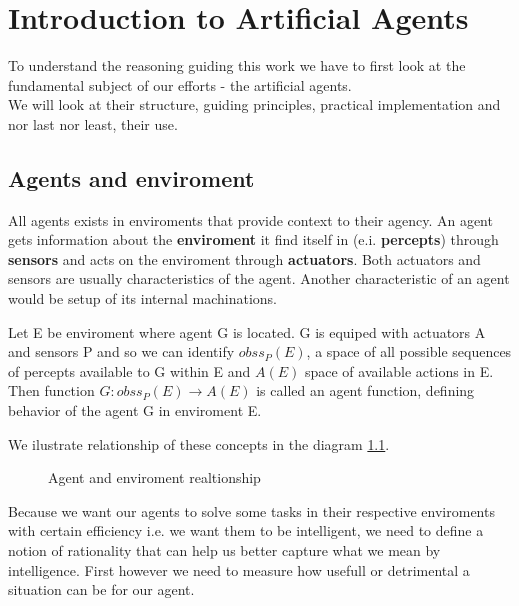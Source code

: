 \chapter{Introduction to Artificial Agents}
To understand the reasoning guiding this work we have to first look at the fundamental subject of our efforts - the artificial agents.\\
We will look at their structure, guiding principles, practical implementation and nor last nor least, their use.
\section{Agents and enviroment}
All agents exists in enviroments that provide context to their agency. An agent gets information about the \textbf{enviroment} it find itself in (e.i. \textbf{percepts}) through \textbf{sensors} and acts on the enviroment through \textbf{actuators}. Both actuators and sensors are usually characteristics of the agent. Another characteristic of an agent would be setup of its internal machinations.
\begin{defn}\citep{russell2021}
Let E be enviroment where agent G is located. G is equiped with actuators A and sensors P and so we can identify $ obss_P(E) $, a space of all possible sequences of percepts available to G within E and $ A(E) $ space of available actions in E.
Then function $ G: obss_P(E)\rightarrow A(E) $ is called an agent function, defining behavior of the agent G in enviroment E.
\end{defn}
We ilustrate relationship of these concepts in the diagram \ref{fig:generalagent}.
\begin{figure}
\label{fig:generalagent}
  \caption{Agent and enviroment realtionship}
\end{figure}
Because we want our agents to solve some tasks in their respective enviroments with certain efficiency i.e. we want them to be intelligent, we need to define a notion of rationality that can help us better capture what we mean by intelligence. First however we need to measure how usefull or detrimental a situation can be for our agent.
